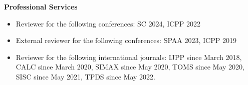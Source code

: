 \documentclass[letterpaper,11pt]{article}
\newcommand{\resheading}[1]{{\large \colorbox{mygrey}{\begin{minipage}{\textwidth}{\textbf{#1 \vphantom{p\^{E}}}}\end{minipage}}}}
\begin{document}
\vspace{0.1in}
\resheading{Professional Services}
\begin{itemize}
	\item Reviewer for the following conferences: SC 2024, ICPP 2022
	\item External reviewer for the following conferences: SPAA 2023, ICPP 2019
	\item Reviewer for the following international journals: IJPP since March 2018, CALC since March 2020, SIMAX since May 2020, TOMS since May 2020, SISC since May 2021, TPDS since May 2022.
\end{itemize}


\end{document}
